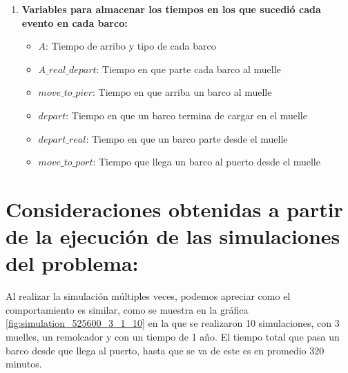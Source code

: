\documentclass[titlepage,11pt]{scrartcl}
\begin{document}
\begin{enumerate}
\begin{itemize}
			\end{itemize}
		\item \textbf{Variables para almacenar los tiempos en los que sucedió cada evento en cada barco:}
			\begin{itemize}
				\item $A$: Tiempo de arribo y tipo de cada barco
    			\item $A\_real\_depart$: Tiempo en que parte cada barco al muelle
    			\item $move\_to\_pier$: Tiempo en que arriba un barco al muelle
    			\item $depart$: Tiempo en que un barco termina de cargar en el muelle
    			\item $depart\_real$: Tiempo en que un barco parte desde el muelle
    			\item $move\_to\_port$: Tiempo que llega un barco al puerto desde el muelle
			\end{itemize}
	\end{enumerate}


\section{Consideraciones obtenidas a partir de la ejecución de las simulaciones del
problema:}

	Al realizar la simulación múltiples veces, podemos apreciar como el comportamiento es similar, como se muestra en la gráfica \ref{fig:simulation_525600_3_1_10} en la que se realizaron 10 simulaciones, con 3 muelles, un remolcador y con un tiempo de 1 año. El tiempo total que pasa un barco desde que llega al puerto, hasta que se va de este es en promedio 320 minutos.
	
\end{document}

